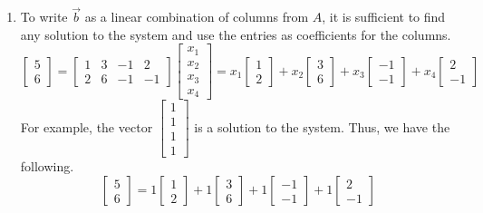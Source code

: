 \begin{SaveQuestion}
\begin{enumerate}
        \item To write $\vec b$ as a linear combination of columns from $A$, it is sufficient to find any solution to the system and use the entries as coefficients for the columns. 
        $$\begin{bmatrix} 5 \\ 6 \end{bmatrix} = \begin{bmatrix} 1 & 3 & -1 & 2 \\ 2 & 6 & -1 & -1 \end{bmatrix} \begin{bmatrix} x_1 \\ x_2 \\ x_3 \\ x_4 \end{bmatrix} = x_1 \begin{bmatrix} 1 \\ 2 \end{bmatrix} + x_2 \begin{bmatrix} 3 \\ 6 \end{bmatrix} + x_3 \begin{bmatrix} -1 \\ -1 \end{bmatrix} + x_4 \begin{bmatrix} 2 \\ -1 \end{bmatrix}$$
        For example, the vector $\begin{bmatrix} 1 \\ 1 \\ 1 \\ 1 \end{bmatrix}$ is a solution to the system. Thus, we have the following.
        $$\begin{bmatrix} 5 \\ 6 \end{bmatrix} = 1 \begin{bmatrix} 1 \\ 2 \end{bmatrix} + 1 \begin{bmatrix} 3 \\ 6 \end{bmatrix} + 1 \begin{bmatrix} -1 \\ -1 \end{bmatrix} + 1 \begin{bmatrix} 2 \\ -1 \end{bmatrix}$$
    \end{enumerate}
\end{SaveQuestion}


